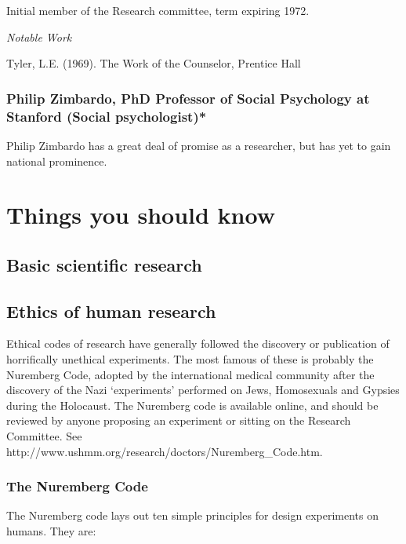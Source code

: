 Initial member of the Research committee, term expiring 1972.

\emph{Notable Work}

Tyler, L.E. (1969). The Work of the Counselor, Prentice Hall

\subsubsection{Philip Zimbardo, PhD Professor of Social Psychology at Stanford (Social psychologist)*}
\label{philipzimbardophdprofessorofsocialpsychologyatstanfordsocialpsychologist}

Philip Zimbardo has a great deal of promise as a researcher, but has yet to gain national prominence.

\section{Things you should know}
\label{thingsyoushouldknow}

\subsection{Basic scientific research}
\label{basicscientificresearch}

\subsection{Ethics of human research}
\label{ethicsofhumanresearch}

Ethical codes of research have generally followed the discovery or publication of horrifically unethical experiments. The most famous of these is probably the Nuremberg Code, adopted by the international medical community after the discovery of the Nazi `experiments' performed on Jews, Homosexuals and Gypsies during the Holocaust. The Nuremberg code is available online, and should be reviewed by anyone proposing an experiment or sitting on the Research Committee. See http:\slash \slash www.ushmm.org\slash research\slash doctors\slash Nuremberg\_Code.htm.

\subsubsection{The Nuremberg Code}
\label{thenurembergcode}

The Nuremberg code lays out ten simple principles for design experiments on humans. They are:

